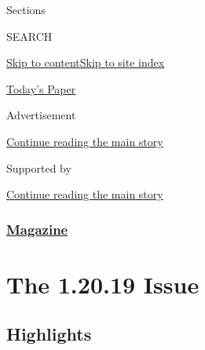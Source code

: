 Sections

SEARCH

\protect\hyperlink{site-content}{Skip to
content}\protect\hyperlink{site-index}{Skip to site index}

\href{https://myaccount.nytimes3xbfgragh.onion/auth/login?response_type=cookie\&client_id=vi}{}

\href{https://www.nytimes3xbfgragh.onion/section/todayspaper}{Today's
Paper}

Advertisement

\protect\hyperlink{after-top}{Continue reading the main story}

Supported by

\protect\hyperlink{after-sponsor}{Continue reading the main story}

\hypertarget{magazine}{%
\subsubsection{\texorpdfstring{\href{/section/magazine}{Magazine}}{Magazine}}\label{magazine}}

\hypertarget{the-12019-issue}{%
\section{The 1.20.19 Issue}\label{the-12019-issue}}

\hypertarget{highlights}{%
\subsection{Highlights}\label{highlights}}

